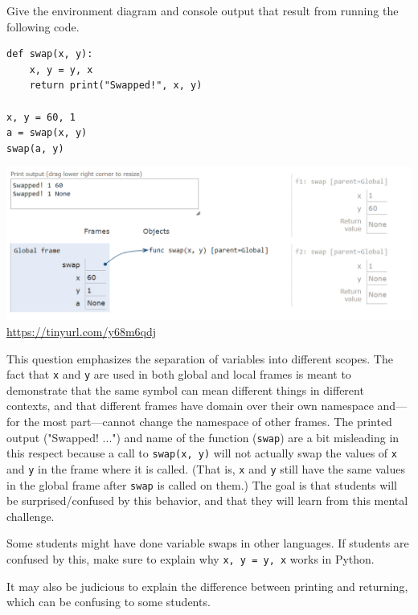 \begin{blocksection}
\question Give the environment diagram and console output that result from running the following code.

\begin{lstlisting}
def swap(x, y):
    x, y = y, x
    return print("Swapped!", x, y)

x, y = 60, 1
a = swap(x, y)
swap(a, y)
\end{lstlisting}

\begin{solution}[2in]
\includegraphics[scale=0.5]{swap.png}
\\
\url{https://tinyurl.com/y68m6qdj}
\end{solution}
\end{blocksection}

\begin{questionmeta}
  This question emphasizes the separation of variables into different scopes. The fact that \lstinline{x} and \lstinline{y} are used in both global and local frames is meant to demonstrate that the same symbol can mean different things in different contexts, and that different frames have domain over their own namespace and---for the most part---cannot change the namespace of other frames. The printed output ("Swapped! ...") and name of the function (\lstinline{swap}) are a bit misleading in this respect because a call to \lstinline{swap(x, y)} will not actually swap the values of \lstinline{x} and \lstinline{y} in the frame where it is called. (That is, \lstinline{x} and \lstinline{y} still have the same values in the global frame after \lstinline{swap} is called on them.) The goal is that students will be surprised/confused by this behavior, and that they will learn from this mental challenge. 

  Some students might have done variable swaps in other languages. If students are confused by this, make sure to explain why \lstinline{x, y = y, x} works in Python.

  It may also be judicious to explain the difference between printing and returning, which can be confusing to some students. 
\end{questionmeta}
